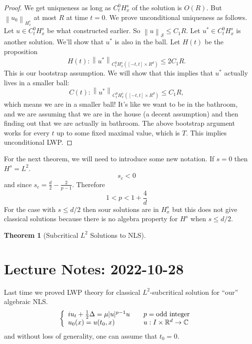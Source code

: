\documentclass{article}
\newtheorem{theorem}{Theorem}
\def\R{\mathbb{R}} %
\newcommand\norm[1]{\left\lVert#1\right\rVert}
\begin{document}
\begin{proof}
  We get uniqueness as long as $C_{t}^{0}H_{x}^{s}$ of the solution is $O(R)$.
  But $\norm{u_0}_{H_{x}^{s}}$ at most $R$ at time $t=0$. We prove unconditional
  uniqueness as follows. Let $u\in C_{t}^{0}H^{s}_{x}$ be what constructed
  earlier. So $\norm{u}_{\mathcal{S}}\leq C_{1}R$. Let $u^{*}\in
  C_{t}^{0}H^{s}_{x}$ is another solution. We'll show that $u^{*}$ is also in
  the ball. Let $H(t)$ be the proposition
  \begin{equation*}
    H(t):
    \norm{u^{*}}_{C_{t}^{0}H_{x}^{s}\left( [-t,t]\times R^{d} \right) } 
    \leq 2C_{1}R.
  \end{equation*}
  This is our bootstrap assumption. We will show that this implies that $u^{*}$
  actually lives in a smaller ball:
  \begin{equation*}
    C(t):
    \norm{u^{*}}_{C_{t}^{0}H_{x}^{s}\left( [-t,t]\times R^{d} \right) } 
    \leq C_{1}R,
  \end{equation*}
  which means we are in a smaller ball! It's like we want to be in the bathroom,
  and we are assuming that we are in the house (a decent assumption) and then
  finding out that we are actually in bathroom. The above bootstrap argument
  works for every $t$ up to some fixed maximal value, which is $T$. This implies
  unconditional LWP.   
\end{proof}
For the next theorem, we will need to introduce some new notation. If $s=0$ then $H^{s}=L^{2}$. 
\begin{equation*}
  s_{c}<0
\end{equation*}
and since $s_{c}=\frac{d}{2}-\frac{2}{p-1}$. Therefore
\begin{equation*}
  1<p <1+\frac{4}{d}
\end{equation*}
For the case with $s \leq d/2$ then sour solutions are in $H_{x}^{s}$ but this
does not give classical solutions because there is no algebra property for
$H^{s}$ when $s \leq d/2$.

\begin{theorem}[Subcritical $L^2$ Solutions to NLS]
  \label{thm:subcritical-L2-solutions-nls}  
\end{theorem}
\section{Lecture Notes:  2022-10-28}
Last time we proved LWP theory for classical $L^{2}$-subcritical solution for
``our'' algebraic NLS.
\begin{equation}\label{eq:NLS-2022-10-28}
  \left\{
    \begin{array}{l@{\quad\quad}l} iu_{t}+\frac{1}{2}\Delta = \mu|u|^{p-1}u &
      p=\text{odd integer}\\
      u_{0}(x)= u(t_{0},x)& u:I\times \R^d \to \mathbb{C}
    \end{array}
  \right.
\end{equation}
and without loss of generality, one can assume that $t_{0}=0$.
\end{document}
